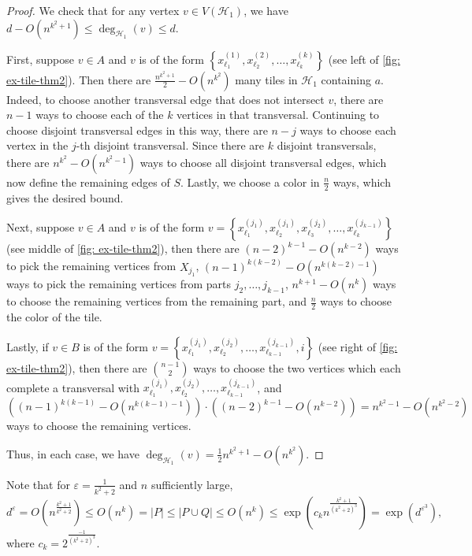 \documentclass{article}
\theoremstyle{definition}
\newcommand\cH{{\mathcal H}}
\begin{document}
\begin{proof}
We check that for any vertex $v \in V(\cH_1)$, we have $d - O(n^{k^2+1}) \leq \deg_{\cH_1}(v) \leq d$.  

First, suppose $v \in A$ and $v$ is of the form $\left\{x_{\ell_1}^{(1)},x_{\ell_2}^{(2)},\dots,x_{\ell_k}^{(k)}\right\}$ (see left of \cref{fig: ex-tile-thm2}).  Then there are $\frac{n^{k^2+1}}{2} - O(n^{k^2})$ many tiles in $\cH_1$ containing $a$. Indeed, to choose another transversal edge that does not intersect $v$, there are $n-1$ ways to choose each of the $k$ vertices in that transversal. Continuing to choose disjoint transversal edges in this way, there are $n-j$ ways to choose each vertex in the $j$-th disjoint transversal. Since there are $k$ disjoint transversals, there are $n^{k^2} - O(n^{k^2 - 1})$ ways to choose all disjoint transversal edges, which now define the remaining edges of $S$. Lastly, we choose a color in $\frac{n}{2}$ ways, which gives the desired bound.

Next, suppose $v \in A$ and $v$ is of the form $v=\left\{x^{(j_1)}_{\ell_1},x^{(j_1)}_{\ell_2}, x^{(j_2)}_{\ell_3}, \dots, x^{(j_{k-1})}_{\ell_{k}}\right\}$ (see middle of \cref{fig: ex-tile-thm2}), then there are $(n-2)^{k-1} - O(n^{k-2})$ ways to pick the remaining vertices from $X_{j_1}$, $(n-1)^{k(k-2)} - O(n^{k(k-2)-1})$ ways to pick the remaining vertices from parts $j_2, \dots, j_{k-1}$, $n^{k+1} - O(n^k)$ ways to choose the remaining vertices from the remaining part, and $\frac{n}{2}$ ways to choose the color of the tile.  

Lastly, if $v\in B$ is of the form $v = \left\{x^{(j_1)}_{\ell_1},  x^{(j_2)}_{\ell_2}, \dots, x^{(j_{k-1})}_{\ell_{k-1}}, i \right\}$ (see right of \cref{fig: ex-tile-thm2}), then there are $\binom{n-1}{2}$ ways to choose the two vertices which each complete a transversal with $x^{(j_1)}_{\ell_1},  x^{(j_2)}_{\ell_2}, \dots, x^{(j_{k-1})}_{\ell_{k-1}}$, and $\left( (n-1)^{k(k-1)} - O(n^{k(k-1)-1}) \right) \cdot \left((n-2)^{k-1} - O(n^{k-2}) \right) = n^{k^2 -1} - O(n^{k^2-2})$ ways to choose the remaining vertices. 

Thus, in each case, we have $\deg_{\cH_1}(v) = \frac{1}{2} n^{k^2 + 1} - O(n^{k^2})$.
\end{proof}

Note that for $\varepsilon = \frac{1}{k^2 + 2}$ and $n$ sufficiently large, 
$$
    d^\varepsilon
    = O \left( n^{\frac{k^2 + 1}{k^2 + 2}} \right)
    \leq O(n^k) = |P| \leq |P \cup Q| 
    \leq O(n^k)
    \leq \exp \left( c_k n^{\frac{k^2 + 1}{(k^2 + 2)^3}} \right)
    = \exp(d^{\varepsilon^3}),
$$
where $c_k = 2^{\frac{-1}{(k^2 + 2)^3}}$.
\end{document}
